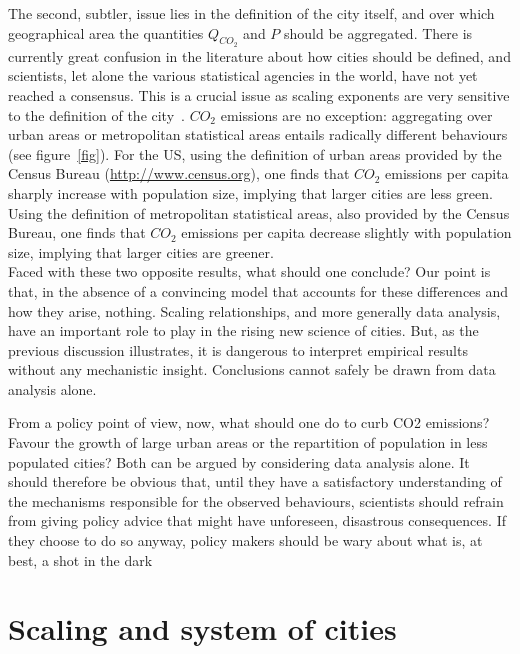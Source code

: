 The second, subtler, issue lies in the definition of the city itself, and over which
geographical area the quantities $Q_{CO_2}$ and $P$ should be aggregated. There is currently great
confusion in the literature about how cities should be defined, and scientists, let alone the
various statistical agencies in the world, have not yet reached a consensus. This is a crucial
issue as scaling exponents are very sensitive to the definition of the city~\cite{Arcaute:2013}. $CO_2$ emissions are no exception: aggregating over urban areas or metropolitan
statistical areas entails radically different behaviours (see figure~\ref{fig}). For the US, using the
definition of urban areas provided by the Census Bureau (\url{http://www.census.org}), one finds
that $CO_2$ emissions per capita sharply increase with population size, implying that larger
cities are less green. Using the definition of metropolitan statistical areas, also provided by
the Census Bureau, one finds that $CO_2$ emissions per capita decrease slightly with population
size, implying that larger cities are greener.\\



Faced with these two opposite results, what should one conclude? Our point is that, in
the absence of a convincing model that accounts for these differences and how they arise,
nothing. Scaling relationships, and more generally data analysis, have an important role
to play in the rising new science of cities. But, as the previous discussion illustrates, it is
dangerous to interpret empirical results without any mechanistic insight. Conclusions cannot
safely be drawn from data analysis alone.

From a policy point of view, now, what should one do to curb CO2 emissions? Favour
the growth of large urban areas or the repartition of population in less populated cities?
Both can be argued by considering data analysis alone. It should therefore be obvious that,
until they have a satisfactory understanding of the mechanisms responsible for the observed
behaviours, scientists should refrain from giving policy advice that might have unforeseen,
disastrous consequences. If they choose to do so anyway, policy makers should be wary
about what is, at best, a shot in the dark

\section{Scaling and system of cities}
\label{sec:scaling_and_system_of_cities}

